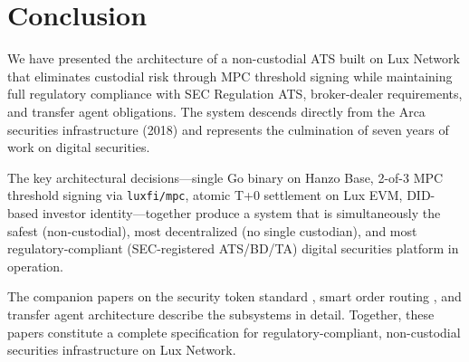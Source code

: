 \documentclass[11pt,a4paper]{article}
\begin{document}
\section{Conclusion}

We have presented the architecture of a non-custodial ATS built on Lux Network that eliminates custodial risk through MPC threshold signing while maintaining full regulatory compliance with SEC Regulation ATS, broker-dealer requirements, and transfer agent obligations. The system descends directly from the Arca securities infrastructure (2018) and represents the culmination of seven years of work on digital securities.

The key architectural decisions---single Go binary on Hanzo Base, 2-of-3 MPC threshold signing via \texttt{luxfi/mpc}, atomic T+0 settlement on Lux EVM, DID-based investor identity---together produce a system that is simultaneously the safest (non-custodial), most decentralized (no single custodian), and most regulatory-compliant (SEC-registered ATS/BD/TA) digital securities platform in operation.

The companion papers on the security token standard \cite{lux-security-token-standard}, smart order routing \cite{lux-smart-order-routing}, and transfer agent architecture \cite{lux-transfer-agent} describe the subsystems in detail. Together, these papers constitute a complete specification for regulatory-compliant, non-custodial securities infrastructure on Lux Network.
\end{document}
